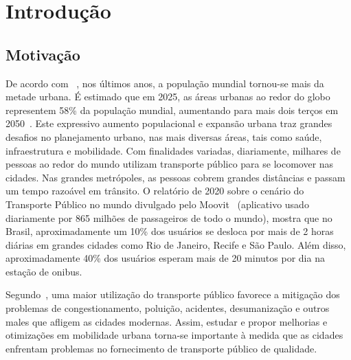
\chapter{Introdução}\label{cap:introducao}

\section{Motivação}

De acordo com ~\cite{Dem:20}, nos últimos anos, a população mundial tornou-se mais da metade urbana. É estimado que em 2025, as áreas urbanas ao redor do globo representem 58\% da população mundial, aumentando para mais dois terços em 2050~\cite{new:20}. 
Este expressivo aumento populacional e expansão urbana traz grandes desafios no planejamento urbano, nas mais diversas áreas, tais como saúde, infraestrutura e mobilidade. 
Com finalidades variadas, diariamente, milhares de pessoas ao redor do mundo utilizam transporte público para se locomover nas cidades.
Nas grandes metrópoles, as pessoas cobrem grandes distâncias e passam um tempo razoável em trânsito.
O relatório de 2020 sobre o cenário do Transporte Público no mundo divulgado pelo Moovit~\cite{Mov:20} (aplicativo usado diariamente por 865 milhões de passageiros de todo o mundo), mostra que no Brasil, aproximadamente
um 10\% dos usuários se desloca por mais de 2 horas diárias em grandes cidades como Rio de Janeiro, Recife e São Paulo. Além disso, aproximadamente 40\% dos usuários esperam mais de 20 minutos por dia na estação de onibus.

Segundo~\cite{fer:04}, uma maior utilização do transporte público favorece a mitigação dos problemas de congestionamento, poluição, acidentes, desumanização e outros males que afligem as cidades modernas. 
Assim, estudar e propor melhorias e otimizações em mobilidade urbana torna-se importante à medida que as cidades enfrentam problemas no fornecimento de transporte público de qualidade.

